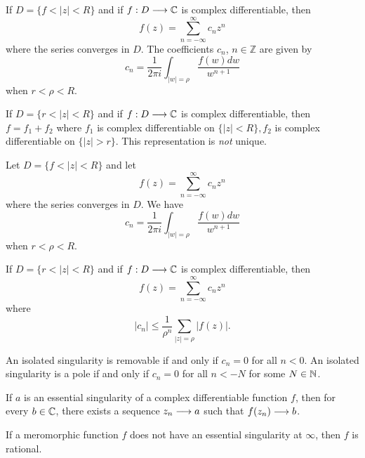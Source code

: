 \documentclass{unswmaths}
\begin{document}
\begin{theorem}
    If $ D = \{ f < |z| < R \} $ and if $ f : D \longrightarrow \mathbb{C} $ is complex differentiable, then
    $$
        f(z) = \sum_{n = -\infty}^\infty c_n z^n
    $$
    where the series converges in $ D $. The coefficients $ c_n $, $ n \in \mathbb{Z} $ are given by
    $$
        c_n = \frac{1}{2\pi i} \int_{|w| = \rho} \frac{f(w)dw}{w^{n+1}}
    $$
    when $ r < \rho < R $.
\end{theorem}

\begin{corollary}
    If $ D = \{ r < |z| < R \} $ and if $ f : D \longrightarrow \mathbb{C} $ is complex differentiable, then $ f = f_1 + f_2 $ where $ f_1 $ is complex differentiable on $ \{|z| < R\}, f_2 $ is complex differentiable on $ \{ |z| > r\} $. This representation is \emph{not} unique.
\end{corollary}

\begin{theorem}
    Let $ D = \{ f < |z| < R \} $ and let 
    $$
        f(z) = \sum_{n = -\infty}^\infty c_n z^n
    $$
    where the series converges in $ D $. We have
    $$
        c_n = \frac{1}{2\pi i } \int_{|w| = \rho} \frac{f(w)dw}{w^{n+1}}
    $$
    when $ r < \rho < R $.
\end{theorem}

\begin{theorem}
	If $ D = \{ r < |z| < R \} $ and if $ f: D \longrightarrow \mathbb{C} $ is complex differentiable, then
	$$
		f(z) = \sum_{n=-\infty}^\infty c_nz^{n}
	$$
	where
	$$
		|c_n| \leq \frac{1}{\rho^n} \sum_{|z| = \rho} |f(z)|.
	$$
\end{theorem}

\begin{theorem}
	An isolated singularity is removable if and only if $ c_n = 0 $ for all $ n < 0 $. An isolated singularity is a pole if and only if $ c_n = 0 $ for all $ n < -N $ for some $ N \in \mathbb{N} $.
\end{theorem}

\begin{theorem}
	If $ a $ is an essential singularity of a complex differentiable function $ f $, then for every $ b \in \mathbb{C} $, there exists a sequence $ z_n \longrightarrow a $ such that $ f(z_n) \longrightarrow b $.
\end{theorem}

\begin{theorem}
If a meromorphic function $ f $ does not have an essential singularity at $ \infty $, then $ f $ is rational.
\end{theorem}
\end{document}
